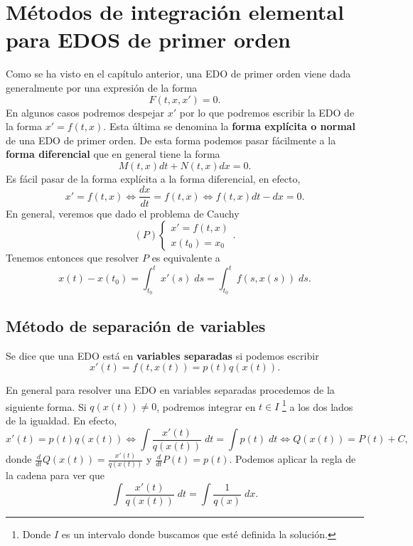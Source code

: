 \chapter{Métodos de integración elemental para EDOS de primer orden}
Como se ha visto en el capítulo anterior, una EDO de primer orden viene dada generalmente por una expresión de la forma 
\[ F\left(t, x, x'\right)=0 .\]
En algunos casos podremos despejar $\displaystyle x' $ por lo que podremos escribir la EDO de la forma $\displaystyle x' = f\left(t,x\right) $. Esta última se denomina la \textbf{forma explícita o normal} de una EDO de primer orden. De esta forma podemos pasar fácilmente a la \textbf{forma diferencial} que en general tiene la forma
\[M\left(t,x\right)dt + N\left(t,x\right)dx = 0 .\]
Es fácil pasar de la forma explícita a la forma diferencial, en efecto, 
\[x' = f\left(t,x\right) \iff \frac{dx}{dt} = f\left(t,x\right) \iff f\left(t,x\right)dt-dx = 0 .\]
En general, veremos que dado el problema de Cauchy
\[ \left(P\right)
\begin{cases}
x' = f\left(t,x\right) \\
x\left(t_{0}\right)=x_{0}
\end{cases}
.\]
Tenemos entonces que resolver $\displaystyle P $ es equivalente a 
\[x\left(t\right)- x\left(t_{0}\right)= \int^{t}_{t_{0}} x'\left(s\right) \; d s = \int^{t}_{t_{0}} f\left(s, x\left(s\right)\right) \; d s  .\]

\section{Método de separación de variables}
\begin{definition}
Se dice que una EDO está en \textbf{variables separadas} si podemos escribir 
\[x'\left(t\right) = f\left(t,x\left(t\right)\right) = p\left(t\right)q\left(x\left(t\right)\right) .\]
\end{definition}
\begin{observation}
	En general para resolver una EDO en variables separadas procedemos de la siguiente forma. Si $\displaystyle q\left(x\left(t\right)\right) \neq 0 $, podremos integrar en $\displaystyle t \in I $ \footnote{Donde $\displaystyle I $ es un intervalo donde buscamos que esté definida la solución.} a los dos lados de la igualdad. En efecto,
\[ x'\left(t\right) = p\left(t\right)q\left(x\left(t\right)\right) \iff \int \frac{x'\left(t\right)}{q\left(x\left(t\right)\right)} \; dt = \int p\left(t\right) \; dt \iff Q\left(x\left(t\right)\right) = P\left(t\right) + C,\]
donde $\displaystyle \frac{d}{dt}Q\left(x\left(t\right)\right) = \frac{x'\left(t\right)}{q\left(x\left(t\right)\right)} $ y $\displaystyle \frac{d}{dt}P\left(t\right) = p\left(t\right) $. Podemos aplicar la regla de la cadena para ver que 
\[\int \frac{x'\left(t\right)}{q\left(x\left(t\right)\right)} \; dt = \int \frac{1}{q\left(x\right)} \; dx .\]
\end{observation} 

